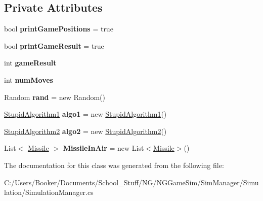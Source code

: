 \subsection*{Private Attributes}
\begin{DoxyCompactItemize}
\item 
\mbox{\label{class_n_g_sim_1_1_simulation_1_1_simulation_manager_a88e2d022428a5d68ecf1e8ca6478e62e}} 
bool {\bfseries print\+Game\+Positions} = true
\item 
\mbox{\label{class_n_g_sim_1_1_simulation_1_1_simulation_manager_a0446e35590be49092413b580c51a209b}} 
bool {\bfseries print\+Game\+Result} = true
\item 
\mbox{\label{class_n_g_sim_1_1_simulation_1_1_simulation_manager_ac97f8eb51b3be48372858d9435ee8def}} 
int {\bfseries game\+Result}
\item 
\mbox{\label{class_n_g_sim_1_1_simulation_1_1_simulation_manager_a65a9376a8491c969ed5599b349c36afa}} 
int {\bfseries num\+Moves}
\item 
\mbox{\label{class_n_g_sim_1_1_simulation_1_1_simulation_manager_af93167702dfcca1d634312c56180de0a}} 
Random {\bfseries rand} = new Random()
\item 
\mbox{\label{class_n_g_sim_1_1_simulation_1_1_simulation_manager_a52b82a1c53a3b1d276c7d2527021b677}} 
\hyperlink{class_n_g_sim_1_1_stupid_algorithm1}{Stupid\+Algorithm1} {\bfseries algo1} = new \hyperlink{class_n_g_sim_1_1_stupid_algorithm1}{Stupid\+Algorithm1}()
\item 
\mbox{\label{class_n_g_sim_1_1_simulation_1_1_simulation_manager_aae68d5fd3b7d3d25062a16d536b27af4}} 
\hyperlink{class_n_g_sim_1_1_stupid_algorithm2}{Stupid\+Algorithm2} {\bfseries algo2} = new \hyperlink{class_n_g_sim_1_1_stupid_algorithm2}{Stupid\+Algorithm2}()
\item 
\mbox{\label{class_n_g_sim_1_1_simulation_1_1_simulation_manager_a4e7054f9038e9616d5810c633cb212db}} 
List$<$ \hyperlink{struct_n_g_a_p_i_1_1_missile}{Missile} $>$ {\bfseries Missile\+In\+Air} = new List$<$\hyperlink{struct_n_g_a_p_i_1_1_missile}{Missile}$>$()
\end{DoxyCompactItemize}


The documentation for this class was generated from the following file\+:\begin{DoxyCompactItemize}
\item 
C\+:/\+Users/\+Booker/\+Documents/\+School\+\_\+\+Stuff/\+N\+G/\+N\+G\+Game\+Sim/\+Sim\+Manager/\+Simulation/Simulation\+Manager.\+cs\end{DoxyCompactItemize}
